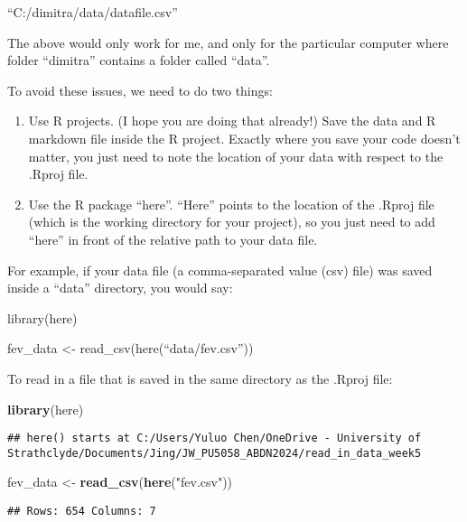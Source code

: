 \documentclass[
]{article}
\newenvironment{Shaded}{\begin{snugshade}}{\end{snugshade}}
\newcommand{\FunctionTok}[1]{\textcolor[rgb]{0.13,0.29,0.53}{\textbf{#1}}}
\newcommand{\NormalTok}[1]{#1}
\newcommand{\OtherTok}[1]{\textcolor[rgb]{0.56,0.35,0.01}{#1}}
\newcommand{\StringTok}[1]{\textcolor[rgb]{0.31,0.60,0.02}{#1}}
\providecommand{\tightlist}{%
  \setlength{\itemsep}{0pt}\setlength{\parskip}{0pt}}
\begin{document}
``C:/dimitra/data/datafile.csv''

The above would only work for me, and only for the particular computer
where folder ``dimitra'' contains a folder called ``data''.

To avoid these issues, we need to do two things:

\begin{enumerate}
\def\labelenumi{\arabic{enumi}.}
\tightlist
\item
  Use R projects. (I hope you are doing that already!) Save the data and
  R markdown file inside the R project. Exactly where you save your code
  doesn't matter, you just need to note the location of your data with
  respect to the .Rproj file.
\item
  Use the R package ``here''. ``Here'' points to the location of the
  .Rproj file (which is the working directory for your project), so you
  just need to add ``here'' in front of the relative path to your data
  file.
\end{enumerate}

For example, if your data file (a comma-separated value (csv) file) was
saved inside a ``data'' directory, you would say:

library(here)

fev\_data \textless- read\_csv(here(``data/fev.csv''))

To read in a file that is saved in the same directory as the .Rproj
file:

\begin{Shaded}
\begin{Highlighting}[]
\FunctionTok{library}\NormalTok{(here)}
\end{Highlighting}
\end{Shaded}

\begin{verbatim}
## here() starts at C:/Users/Yuluo Chen/OneDrive - University of Strathclyde/Documents/Jing/JW_PU5058_ABDN2024/read_in_data_week5
\end{verbatim}

\begin{Shaded}
\begin{Highlighting}[]
\NormalTok{fev\_data }\OtherTok{\textless{}{-}} \FunctionTok{read\_csv}\NormalTok{(}\FunctionTok{here}\NormalTok{(}\StringTok{"fev.csv"}\NormalTok{))}
\end{Highlighting}
\end{Shaded}

\begin{verbatim}
## Rows: 654 Columns: 7
\end{verbatim}
\end{document}
